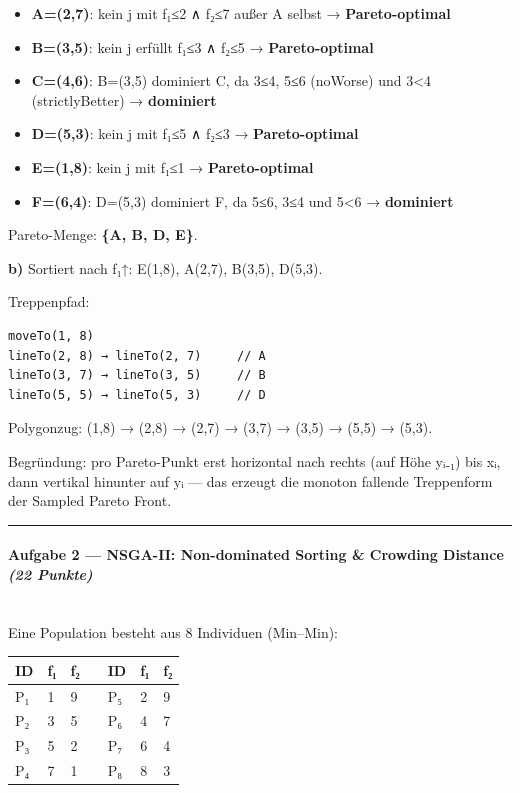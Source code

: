 \documentclass[11pt, a4paper]{article}
\begin{document}
\begin{itemize}
  \item \textbf{A=(2,7)}: kein j mit f₁≤2 ∧ f₂≤7 außer A selbst → \textbf{Pareto-optimal}
  \item \textbf{B=(3,5)}: kein j erfüllt f₁≤3 ∧ f₂≤5 → \textbf{Pareto-optimal}
  \item \textbf{C=(4,6)}: B=(3,5) dominiert C, da 3≤4, 5≤6 (noWorse) und 3<4 (strictlyBetter) → \textbf{dominiert}
  \item \textbf{D=(5,3)}: kein j mit f₁≤5 ∧ f₂≤3 → \textbf{Pareto-optimal}
  \item \textbf{E=(1,8)}: kein j mit f₁≤1 → \textbf{Pareto-optimal}
  \item \textbf{F=(6,4)}: D=(5,3) dominiert F, da 5≤6, 3≤4 und 5<6 → \textbf{dominiert}
\end{itemize}

Pareto-Menge: \textbf{\{A, B, D, E\}}.


\textbf{b)} Sortiert nach f₁↑: E(1,8), A(2,7), B(3,5), D(5,3).


Treppenpfad:

\begin{lstlisting}
moveTo(1, 8)
lineTo(2, 8) → lineTo(2, 7)     // A
lineTo(3, 7) → lineTo(3, 5)     // B
lineTo(5, 5) → lineTo(5, 3)     // D
\end{lstlisting}

Polygonzug: (1,8) → (2,8) → (2,7) → (3,7) → (3,5) → (5,5) → (5,3).

Begründung: pro Pareto-Punkt erst horizontal nach rechts (auf Höhe yᵢ₋₁) bis xᵢ, dann vertikal hinunter auf yᵢ — das erzeugt die monoton fallende Treppenform der Sampled Pareto Front.



\noindent\textcolor{rulegray}{\rule{\linewidth}{0.4pt}}


\paragraph{Aufgabe 2 — NSGA-II: Non-dominated Sorting \& Crowding Distance \textit{(22 Punkte)}}\mbox{}\\[2pt]

Eine Population besteht aus 8 Individuen (Min–Min):



{\footnotesize
\begin{tabularx}{\linewidth}{XXXXXXX}
\hline
\rowcolor{tableheadbg}
{\color{white}\textbf{ID}} & {\color{white}\textbf{f₁}} & {\color{white}\textbf{f₂}} & {\color{white}\textbf{}} & {\color{white}\textbf{ID}} & {\color{white}\textbf{f₁}} & {\color{white}\textbf{f₂}} \\[2pt]
\hline
\endhead
\hline
\endfoot
P₁ & 1 & 9 &  & P₅ & 2 & 9 \\
P₂ & 3 & 5 &  & P₆ & 4 & 7 \\
P₃ & 5 & 2 &  & P₇ & 6 & 4 \\
P₄ & 7 & 1 &  & P₈ & 8 & 3 \\
\end{tabularx}
}
\end{document}
